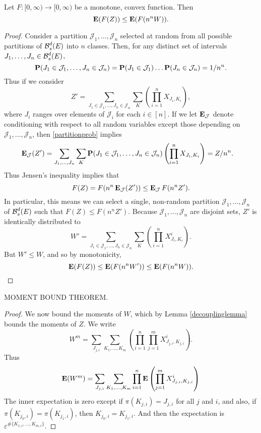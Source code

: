 \begin{lemma} \label{decouplinglemma}
	Let $F: [0,\infty) \to [0,\infty)$ be a monotone, convex function. Then
	\[ \operatorname{\mathbf{E}}(F(Z)) \leq \operatorname{\mathbf{E}}(F(n^n W)). \]
\end{lemma}
\begin{proof}
	Consider a partition $\mathcal{J}_1, \dots, \mathcal{J}_n$ selected at random from all possible partitions of $\operatorname{\mathcal{B}}^d_s(E)$ into $n$ classes. Then, for any distinct set of intervals $J_1, \dots, J_n \in \operatorname{\mathcal{B}}^d_s(E)$,
	\begin{equation} \label{partitionprob}
		\operatorname{\mathbf{P}}(J_1 \in \mathcal{J}_1, \dots, J_n \in \mathcal{J}_n) = \operatorname{\mathbf{P}}(J_1 \in \mathcal{J}_1) \dots \operatorname{\mathbf{P}}(J_n \in \mathcal{J}_n) = 1/n^n.
	\end{equation}
	Thus if we consider
	\[ Z' = \sum_{J_1 \in \mathcal{J}_1, \dots, J_n \in \mathcal{J}_n} \sum_K \left( \prod_{i = 1}^n X_{J_i,K_i} \right), \]
	where $J_i$ ranges over elements of $\mathcal{J}_i$ for each $i \in [n]$. If we let $\operatorname{\mathbf{E}}_{\mathcal{J}}$ denote conditioning with respect to all random variables except those depending on $\mathcal{J}_1, \dots, \mathcal{J}_n$, then \eqref{partitionprob} implies
	\begin{align*}
		\operatorname{\mathbf{E}}_{\mathcal{J}}(Z') &= \sum_{J_1, \dots, J_n} \sum_K \operatorname{\mathbf{P}}(J_1 \in \mathcal{J}_1, \dots, J_n \in \mathcal{J}_n) \left( \prod_{i = 1}^n X_{J_i,K_i} \right) = Z/n^n.
	\end{align*}
	Thus Jensen's inequality implies that
	\[ F(Z) = F(n^n \operatorname{\mathbf{E}}_{\mathcal{J}}(Z')) \leq \operatorname{\mathbf{E}}_{\mathcal{J}} F(n^n Z'). \]
	In particular, this means we can select a single, non-random partition $\mathcal{J}_1, \dots, \mathcal{J}_n$ of $\operatorname{\mathcal{B}}^d_s(E)$ such that $F(Z) \leq F(n^n Z')$. Because $\mathcal{J}_1, \dots, \mathcal{J}_n$ are disjoint sets, $Z'$ is identically distributed to
	\[ W' = \sum_{J_1 \in \mathcal{J}_1, \dots, J_n \in \mathcal{J}_n} \sum_K \left( \prod_{i = 1}^n X_{J_i,K_i}^i \right). \]
	But $W' \leq W$, and so by monotonicity,
	\[ \operatorname{\mathbf{E}}(F(Z)) \leq \operatorname{\mathbf{E}}(F(n^n W')) \leq \operatorname{\mathbf{E}}(F(n^n W)). \qedhere \]
\end{proof}

\begin{lemma}
	MOMENT BOUND THEOREM.
\end{lemma}
\begin{proof}
	We now bound the moments of $W$, which by Lemma \ref{decouplinglemma} bounds the moments of $Z$. We write
	\[ W^m = \sum_{J_{j,i}} \sum_{K_1, \dots, K_m} \left( \prod_{i = 1}^n \prod_{j = 1}^m X_{J_{j,i}, K_{j,i}}^i \right). \]
	Thus
	\[ \operatorname{\mathbf{E}}(W^m) = \sum_{J_{j,i}} \sum_{K_1, \dots, K_m} \prod_{i = 1}^n \operatorname{\mathbf{E}} \left( \prod_{j = 1}^m X_{J_{j,i}, K_{j,i}}^i \right) \]
	The inner expectation is zero except if $\pi(K_{j,i}) = J_{j,i}$ for all $j$ and $i$, and also, if $\pi(K_{j_0,i}) = \pi(K_{j_1,i})$, then $K_{j_0,i} = K_{j_1,i}$. And then the expectation is $\varepsilon^{\# \{ K_{1,i}, \dots, K_{m,i} \}}$.
\end{proof}

